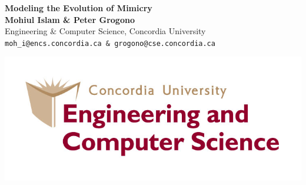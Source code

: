 \documentclass[a0,landscape]{a0poster}
\begin{document}

\begin{minipage}[b]{0.85\linewidth}
\VERYHuge \color{NavyBlue} \textbf{Modeling the Evolution of Mimicry} \color{Black}\\[0.5cm] %
\Huge \textbf{Mohiul Islam \& Peter Grogono}\\[0.5cm] %
\Huge Engineering \& Computer Science, Concordia University\\[0.5cm] %
\huge \texttt{moh\_i@encs.concordia.ca \& grogono@cse.concordia.ca}\\
\end{minipage}
%
\begin{minipage}[b]{0.19\linewidth}
\includegraphics[width=30cm]{logo.jpg} %
\end{minipage}

\vspace{1cm} %

\end{document}
